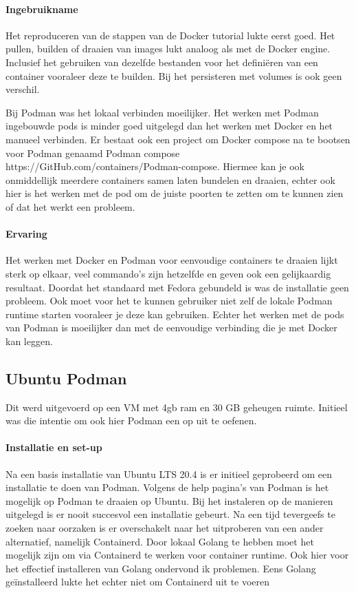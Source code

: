 \begin{itemize}
\paragraph{Ingebruikname}
Het reproduceren van de stappen van de Docker tutorial lukte eerst goed.  Het pullen, builden of draaien van images lukt analoog als met de Docker engine. Inclusief het gebruiken van dezelfde bestanden voor het definiëren van een container vooraleer deze te builden.  Bij het persisteren met volumes is ook geen verschil.

Bij Podman was het lokaal verbinden moeilijker. Het werken met Podman ingebouwde pods is minder goed uitgelegd dan het werken met Docker en het manueel verbinden.  Er bestaat ook een project om Docker compose na te bootsen voor Podman genaamd Podman compose https://GitHub.com/containers/Podman-compose.  Hiermee kan je ook onmiddellijk meerdere containers samen laten bundelen en draaien, echter ook hier is het werken met de pod om de juiste poorten te zetten om te kunnen zien of dat het werkt een probleem.

\paragraph{Ervaring}
Het werken met Docker en Podman voor eenvoudige containers te draaien lijkt sterk op elkaar, veel commando’s zijn hetzelfde en geven ook een gelijkaardig resultaat. Doordat het standaard met Fedora gebundeld is was de installatie geen probleem. Ook moet voor het te kunnen gebruiker niet zelf de lokale Podman runtime starten vooraleer je deze kan gebruiken. Echter het werken met de pods van Podman is moeilijker dan met de eenvoudige verbinding die je met Docker kan leggen.

\subsection{Ubuntu Podman}
Dit werd uitgevoerd op een VM met 4gb ram en 30 GB geheugen ruimte. Initieel was die intentie om ook hier Podman een op uit te oefenen.

\paragraph{Installatie en set-up}
Na een basis installatie van Ubuntu LTS 20.4 is er initieel geprobeerd om een installatie te doen van Podman. Volgens de help pagina’s van Podman is het mogelijk op Podman te draaien op Ubuntu. Bij het instaleren op de manieren uitgelegd is er nooit succesvol een installatie gebeurt. Na een tijd tevergeefs te zoeken naar oorzaken is er overschakelt naar het uitproberen van een ander alternatief, namelijk Containerd.
Door lokaal Golang te hebben moet het mogelijk zijn om via Containerd te werken voor container runtime. Ook hier voor het effectief installeren van Golang ondervond ik problemen.  Eens Golang geïnstalleerd lukte het echter niet om Containerd uit te voeren


\end{itemize}
